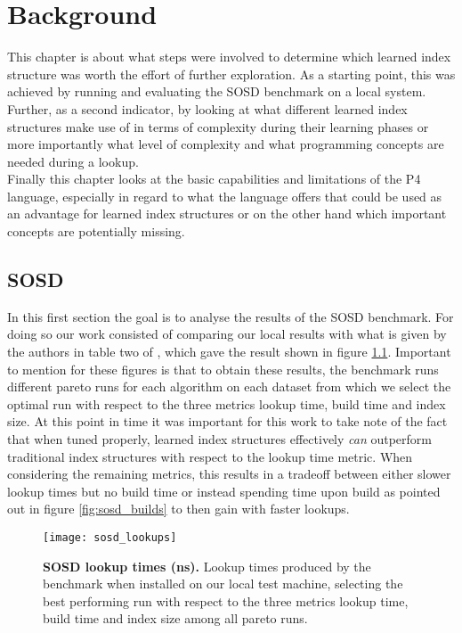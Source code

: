 
\chapter{Background}
\label{ch:background}
This chapter is about what steps were involved to determine which learned index structure was worth the effort of further exploration. As a starting point, this was achieved by running and evaluating the SOSD benchmark \cite{sosd-neurips} on a local system. Further, as a second indicator, by looking at what different learned index structures make use of in terms of complexity during their learning phases or more importantly what level of complexity and what programming concepts are needed during a lookup.\\

Finally this chapter looks at the basic capabilities and limitations of the P4 language, especially in regard to what the language offers that could be used as an advantage for learned index structures or on the other hand which important concepts are potentially missing.

\section{SOSD}
In this first section the goal is to analyse the results of the SOSD benchmark. For doing so our work consisted of comparing our local results with what is given by the authors in table two of \cite{sosd-neurips}, which gave the result shown in figure \ref{fig:sosd_lookups}. Important to mention for these figures is that to obtain these results, the benchmark runs different pareto runs for each algorithm on each dataset from which we select the optimal run with respect to the three metrics lookup time, build time and index size. At this point in time it was important for this work to take note of the fact that when tuned properly, learned index structures effectively \emph{can} outperform traditional index structures with respect to the lookup time metric. When considering the remaining metrics, this results in a tradeoff between either slower lookup times but no build time or instead spending time upon build as pointed out in figure \ref{fig:sosd_builds} to then gain with faster lookups.

\begin{figure}[!ht]
\centering
\texttt{[image: sosd\_lookups]}
\caption[SOSD Lookups]{
  \textbf{SOSD lookup times (ns).}
  Lookup times produced by the benchmark when installed on our local test machine, selecting the best performing run with respect to the three metrics lookup time, build time and index size among all pareto runs.
}
\label{fig:sosd_lookups}
\end{figure}

